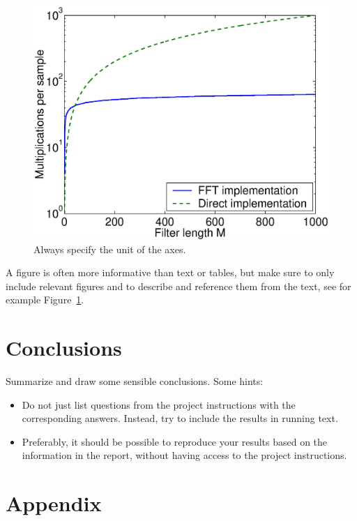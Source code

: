 \documentclass[a4paper,twocolumn]{article}
\begin{document}
\begin{figure}[!ht]
  \begin{center}
    \includegraphics[width=0.83\columnwidth]{optComp.eps}
  \end{center}
  \caption{Always specify the unit of the axes.}
  \label{fig:performance}
\end{figure}
A figure is often more informative than text or tables, but make sure
to only include relevant figures and to describe and reference them
from the text, see for example Figure~\ref{fig:performance}.


\section{Conclusions}
\label{sec:conclusions}

Summarize and draw some sensible conclusions. Some hints:
\begin{itemize}
\item Do not just list questions from the project instructions with
  the corresponding answers. Instead, try to include the results in
  running text.
\item Preferably, it should be possible to reproduce your results
  based on the information in the report, without having access to the
  project instructions.
\end{itemize}

\section*{Appendix}
\end{document}
